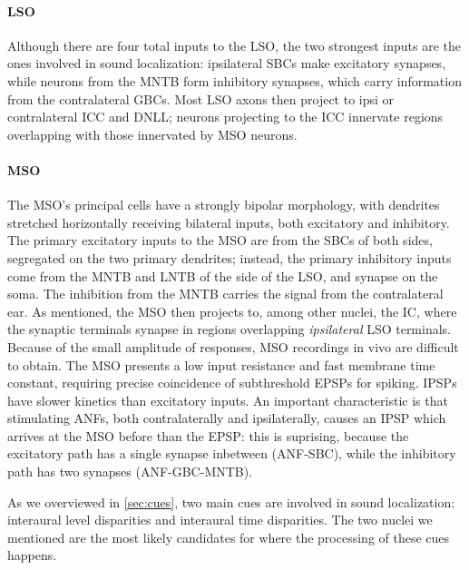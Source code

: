 \documentclass[11pt,a4paper]{article}
\newcommand{\parspace}{\vspace{7pt}}
\begin{document}
\paragraph{LSO}
Although there are four total inputs to the LSO, the two strongest inputs are the ones involved in sound localization: ipsilateral SBCs make excitatory synapses, while neurons from the MNTB form inhibitory synapses, which carry information from the contralateral GBCs. Most LSO axons then project to ipsi or contralateral ICC and DNLL; neurons projecting to the ICC innervate regions overlapping with those innervated by MSO neurons. 

\paragraph{MSO}
The MSO's principal cells have a strongly bipolar morphology, with dendrites stretched horizontally receiving bilateral inputs, both excitatory and inhibitory. The primary excitatory inputs to the MSO are from the SBCs of both sides, segregated on the two primary dendrites; instead, the primary inhibitory inputs come from the MNTB and LNTB of the side of the LSO, and synapse on the soma. The inhibition from the MNTB carries the signal from the contralateral ear. As mentioned, the MSO then projects to, among other nuclei, the IC, where the synaptic terminals synapse in regions overlapping \textit{ipsilateral} LSO terminals. Because of the small amplitude of responses, MSO recordings in vivo are difficult to obtain. The MSO presents a low input resistance and fast membrane time constant, requiring precise coincidence of subthreshold EPSPs for spiking. IPSPs have slower kinetics than excitatory inputs. An important characteristic is that stimulating ANFs, both contralaterally and ipsilaterally, causes an IPSP which arrives at the MSO before than the EPSP: this is suprising, because the excitatory path has a single synapse inbetween (ANF-SBC), while the inhibitory path has two synapses (ANF-GBC-MNTB).

\parspace
As we overviewed in \ref{sec:cues}, two main cues are involved in sound localization: interaural level disparities and interaural time disparities. The two nuclei we mentioned are the most likely candidates for where the processing of these cues happens.
\end{document}
